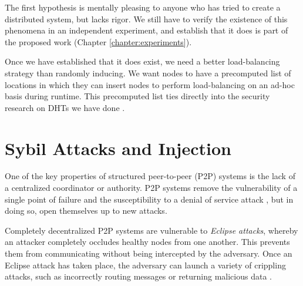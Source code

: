 The first hypothesis is mentally pleasing to anyone who has tried to create a distributed system, but lacks rigor.
We still have to verify the existence of this phenomena in an independent experiment, and establish that it does is part of the proposed work (Chapter \ref{chapter:experiments}).


Once we have established that it does exist, we need a better load-balancing strategy than randomly inducing.
We want nodes to have a precomputed list of locations in which they can insert nodes to perform load-balancing on an ad-hoc basis during runtime.
This precomputed list ties directly into the security research on DHTs we have done \cite{sybil-analysis}.









\section{Sybil Attacks and Injection}
One of the key properties of structured peer-to-peer (P2P) systems is the lack of a centralized coordinator or authority.
P2P systems remove the vulnerability of a single point of failure and the susceptibility to a denial of service attack \cite{sybil}, but in doing so, open themselves up to new attacks.

Completely decentralized P2P systems are vulnerable to \textit{Eclipse attacks}, whereby an attacker completely occludes healthy nodes from one another.
This prevents them from communicating without being intercepted by the adversary.
Once an Eclipse attack has taken place, the adversary can launch a variety of crippling attacks, such as incorrectly routing messages or returning malicious data \cite{srivatsa2004vulnerabilities}.

